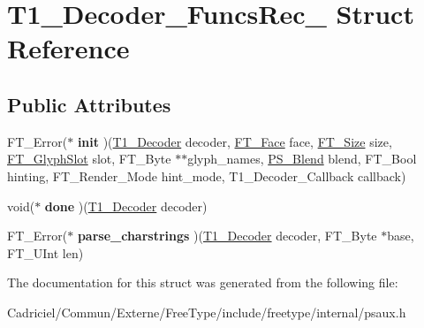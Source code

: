 \hypertarget{struct_t1___decoder___funcs_rec__}{}\section{T1\+\_\+\+Decoder\+\_\+\+Funcs\+Rec\+\_\+ Struct Reference}
\label{struct_t1___decoder___funcs_rec__}
\subsection*{Public Attributes}
\begin{DoxyCompactItemize}
\item 
F\+T\+\_\+\+Error($\ast$ {\bfseries init} )(\hyperlink{struct_t1___decoder_rec__}{T1\+\_\+\+Decoder} decoder, \hyperlink{struct_f_t___face_rec__}{F\+T\+\_\+\+Face} face, \hyperlink{struct_f_t___size_rec__}{F\+T\+\_\+\+Size} size, \hyperlink{struct_f_t___glyph_slot_rec__}{F\+T\+\_\+\+Glyph\+Slot} slot, F\+T\+\_\+\+Byte $\ast$$\ast$glyph\+\_\+names, \hyperlink{struct_p_s___blend_rec__}{P\+S\+\_\+\+Blend} blend, F\+T\+\_\+\+Bool hinting, F\+T\+\_\+\+Render\+\_\+\+Mode hint\+\_\+mode, T1\+\_\+\+Decoder\+\_\+\+Callback callback)\hypertarget{struct_t1___decoder___funcs_rec___ac6c6d5e56e3413bdb3802668e4ce3de7}{}\label{struct_t1___decoder___funcs_rec___ac6c6d5e56e3413bdb3802668e4ce3de7}

\item 
void($\ast$ {\bfseries done} )(\hyperlink{struct_t1___decoder_rec__}{T1\+\_\+\+Decoder} decoder)\hypertarget{struct_t1___decoder___funcs_rec___a766b605fd0a10755d9ce14d2bfea3bc5}{}\label{struct_t1___decoder___funcs_rec___a766b605fd0a10755d9ce14d2bfea3bc5}

\item 
F\+T\+\_\+\+Error($\ast$ {\bfseries parse\+\_\+charstrings} )(\hyperlink{struct_t1___decoder_rec__}{T1\+\_\+\+Decoder} decoder, F\+T\+\_\+\+Byte $\ast$base, F\+T\+\_\+\+U\+Int len)\hypertarget{struct_t1___decoder___funcs_rec___acef414b0ecbec6da63a11c1d94fb7c3e}{}\label{struct_t1___decoder___funcs_rec___acef414b0ecbec6da63a11c1d94fb7c3e}

\end{DoxyCompactItemize}


The documentation for this struct was generated from the following file\+:\begin{DoxyCompactItemize}
\item 
Cadriciel/\+Commun/\+Externe/\+Free\+Type/include/freetype/internal/psaux.\+h\end{DoxyCompactItemize}
